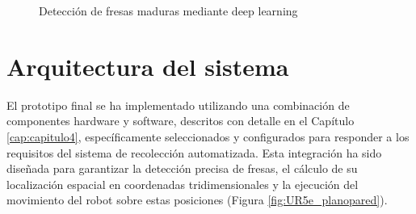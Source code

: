 \begin{figure} [H]
    \begin{center}
    \subcapcentertrue
    \end{center}
    \caption{Detección de fresas maduras mediante deep learning}
    \label{fig:deteccion_dl}
\end{figure}

\section{Arquitectura del sistema}
\label{sec:arquitectura_sistema}

El prototipo final se ha implementado utilizando una combinación de componentes hardware y software, descritos con detalle en el Capítulo \ref{cap:capitulo4}, específicamente seleccionados y configurados para responder a los requisitos del sistema de recolección automatizada. Esta integración ha sido diseñada para garantizar la detección precisa de fresas, el cálculo de su localización espacial en coordenadas tridimensionales y la ejecución del movimiento del robot sobre estas posiciones (Figura \ref{fig:UR5e_planopared}). 

